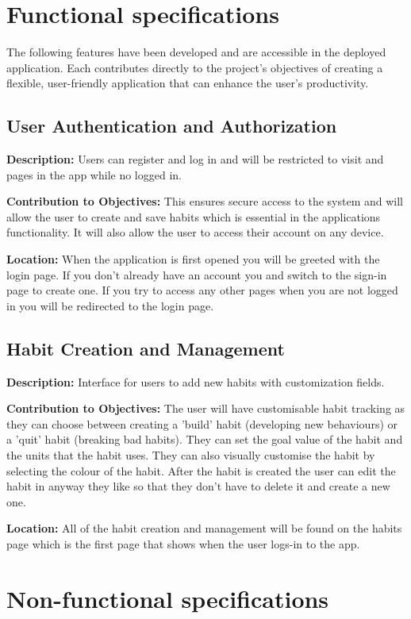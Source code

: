 \section{Functional specifications}
\label{sect:functional-specifications}
The following features have been developed and are accessible in the deployed application. Each contributes directly to the project's objectives of creating a flexible, user-friendly application that can enhance the user's productivity.

\subsection{User Authentication and Authorization}
\textbf{Description:} Users can register and log in and will be restricted to visit and pages in the app while no logged in. 

\textbf{Contribution to Objectives:} This ensures secure access to the system and will allow the user to create and save habits which is essential in the applications functionality. It will also allow the user to access their account on any device.

\textbf{Location:} When the application is first opened you will be greeted with the login page. If you don't already have an account you and switch to the sign-in page to create one. If you try to access any other pages when you are not logged in you will be redirected to the login page.

\subsection{Habit Creation and Management}
\textbf{Description:} Interface for users to add new habits with customization fields.

\textbf{Contribution to Objectives:} The user will have customisable habit tracking as they can choose between creating a 'build' habit (developing new behaviours) or a 'quit' habit (breaking bad habits). They can set the goal value of the habit and the units that the habit uses. They can also visually customise the habit by selecting the colour of the habit. After the habit is created the user can edit the habit in anyway they like so that they don't have to delete it and create a new one.

\textbf{Location:} All of the habit creation and management will be found on the habits page which is the first page that shows when the user logs-in to the app.

\section{Non-functional specifications}
\label{sect:non-functional-specifications}
